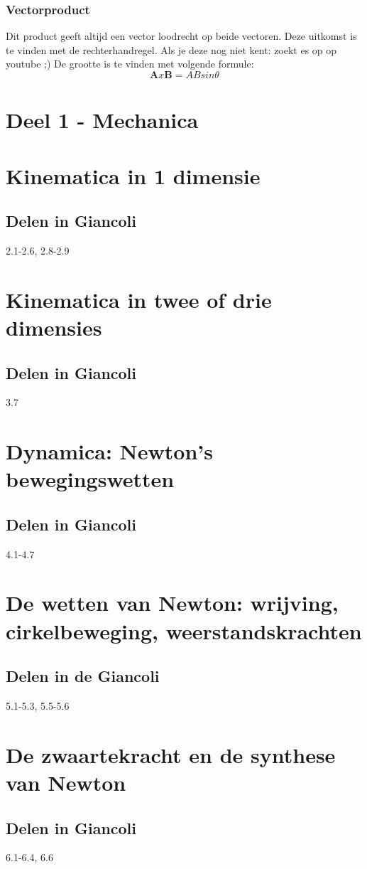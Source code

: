 \documentclass[12pt,a4paper]{article}
\begin{document}
	\subsubsection{Vectorproduct}
	Dit product geeft altijd een vector loodrecht op beide vectoren. Deze uitkomst is te vinden met de rechterhandregel. Als je deze nog niet kent: zoekt es op op youtube ;) 
	De grootte is te vinden met volgende formule: 
	\[\textbf{A} x \textbf{B} = ABsin\theta\]
	\newpage
	\section{Deel 1 - Mechanica}
	\section{Kinematica in 1 dimensie}
	\subsection{Delen in Giancoli}
	2.1-2.6, 2.8-2.9
	\section{Kinematica in twee of drie dimensies}
	\subsection{Delen in Giancoli}
	3.7
	\section{Dynamica: Newton's bewegingswetten}
	\subsection{Delen in Giancoli}
	4.1-4.7
	\section{De wetten van Newton: wrijving, cirkelbeweging, weerstandskrachten}
	\subsection{Delen in de Giancoli}
	5.1-5.3, 5.5-5.6
	\section{De zwaartekracht en de synthese van Newton}
	\subsection{Delen in Giancoli}
	6.1-6.4, 6.6
\end{document}
